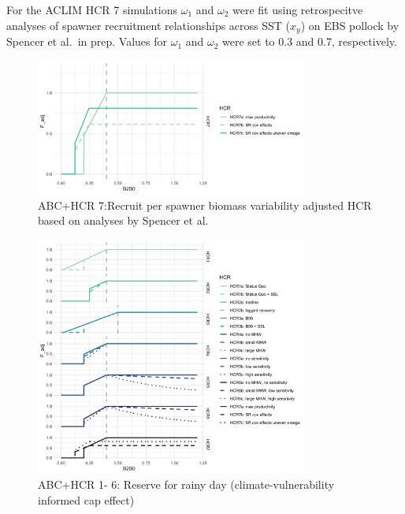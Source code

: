 \documentclass[
]{article}
\begin{document}
For the ACLIM HCR 7 simulations \(\omega_1\) and \(\omega_2\) were fit
using retrospecitve analyses of spawner recruitment relationships across
SST (\(x_y\)) on EBS pollock by Spencer et al.~in prep. Values for
\(\omega_1\) and \(\omega_2\) were set to 0.3 and 0.7, respectively.

\begin{figure}
\centering
\includegraphics[width=0.8\textwidth,height=\textheight]{../../Figs/HCR_figs/HCR7.png}
\caption{ABC+HCR 7:Recruit per spawner biomass variability adjusted HCR
based on analyses by Spencer et al.}
\end{figure}

\begin{figure}
\centering
\includegraphics[width=0.8\textwidth,height=\textheight]{../../Figs/HCR_figs/HCR1TO7.png}
\caption{ABC+HCR 1- 6: Reserve for rainy day (climate-vulnerability
informed cap effect)}
\end{figure}
\end{document}
